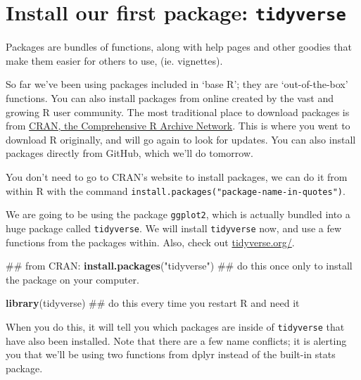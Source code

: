 \documentclass[]{book}
\newenvironment{Shaded}{\begin{snugshade}}{\end{snugshade}}
\newcommand{\KeywordTok}[1]{\textcolor[rgb]{0.13,0.29,0.53}{\textbf{{#1}}}}
\newcommand{\StringTok}[1]{\textcolor[rgb]{0.31,0.60,0.02}{{#1}}}
\newcommand{\NormalTok}[1]{{#1}}
\theoremstyle{definition}
\theoremstyle{definition}
\theoremstyle{definition}
\theoremstyle{remark}
\begin{document}
\section{\texorpdfstring{Install our first package:
\texttt{tidyverse}}{Install our first package: tidyverse}}\label{install-our-first-package-tidyverse}

Packages are bundles of functions, along with help pages and other
goodies that make them easier for others to use, (ie. vignettes).

So far we've been using packages included in `base R'; they are
`out-of-the-box' functions. You can also install packages from online
created by the vast and growing R user community. The most traditional
place to download packages is from
\href{https://cran.r-project.org/}{CRAN, the Comprehensive R Archive
Network}. This is where you went to download R originally, and will go
again to look for updates. You can also install packages directly from
GitHub, which we'll do tomorrow.

You don't need to go to CRAN's website to install packages, we can do it
from within R with the command
\texttt{install.packages("package-name-in-quotes")}.

We are going to be using the package \texttt{ggplot2}, which is actually
bundled into a huge package called \texttt{tidyverse}. We will install
\texttt{tidyverse} now, and use a few functions from the packages
within. Also, check out
\href{https://www.tidyverse.org}{tidyverse.org/}.

\begin{Shaded}
\begin{Highlighting}[]
\NormalTok{## from CRAN:}
\KeywordTok{install.packages}\NormalTok{(}\StringTok{"tidyverse"}\NormalTok{) ## do this once only to install the package on your computer.}
\end{Highlighting}
\end{Shaded}

\begin{Shaded}
\begin{Highlighting}[]
\KeywordTok{library}\NormalTok{(tidyverse) ## do this every time you restart R and need it }
\end{Highlighting}
\end{Shaded}

When you do this, it will tell you which packages are inside of
\texttt{tidyverse} that have also been installed. Note that there are a
few name conflicts; it is alerting you that we'll be using two functions
from dplyr instead of the built-in stats package.
\end{document}
